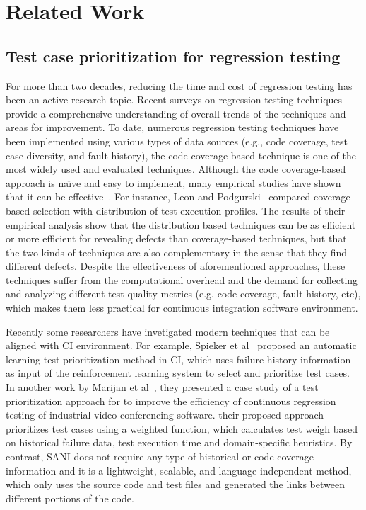 \section{Related Work}
\label{sec:related-work}

\subsection{Test case prioritization for regression testing}

For more than two decades, reducing the time and cost of regression 
testing has been an active research topic. 
Recent surveys on regression testing techniques~\cite{biswas011,
marksurvey} provide a comprehensive understanding of
overall trends of the techniques and areas for improvement.
To date, numerous regression testing techniques have been implemented using 
various types of data sources (e.g., code coverage, test case diversity, 
and fault history), the code coverage-based technique is one of the most 
widely used and evaluated techniques. 
Although the code coverage-based approach is na\"{\i}ve and easy to implement, 
many empirical studies have shown that it can be effective~\cite{cost3, cost1, 
elbaum02feb, myra}. 
For instance, 
Leon and Podgurski~\cite{leon03} 
compared coverage-based selection with  distribution of test execution profiles.
The results of their empirical analysis show that the distribution based
techniques can be as efficient or more efficient for revealing defects 
than coverage-based techniques, but that the two kinds of techniques 
are also complementary in the sense that they find different defects. 
Despite the effectiveness of aforementioned approaches, 
these techniques suffer from the computational overhead and 
the demand for collecting and analyzing different test 
quality metrics (e.g. code coverage, fault history, etc), 
which makes them less practical for continuous integration 
software environment. 


Recently some researchers have invetigated modern techniques 
that can be aligned with CI environment. 
For example, Spieker et al~\cite{spieker17} proposed an 
automatic learning test prioritization method in CI, 
which uses failure history information as input of the 
reinforcement learning system to select
and prioritize test cases. 
In another work by Marijan et al~\cite{marijan13}, they 
presented a case study of a test prioritization approach for
to improve the efficiency of
continuous regression testing of industrial video conferencing
software. their proposed approach prioritizes test cases using a
weighted function, which calculates test weigh 
based on historical failure
data, test execution time and domain-specific heuristics. 
By contrast, SANI  does not require any type of historical or 
code coverage information and it is a lightweight, scalable, and language independent 
method, which only uses the source code and test files and generated the
links between different portions of the code. 

